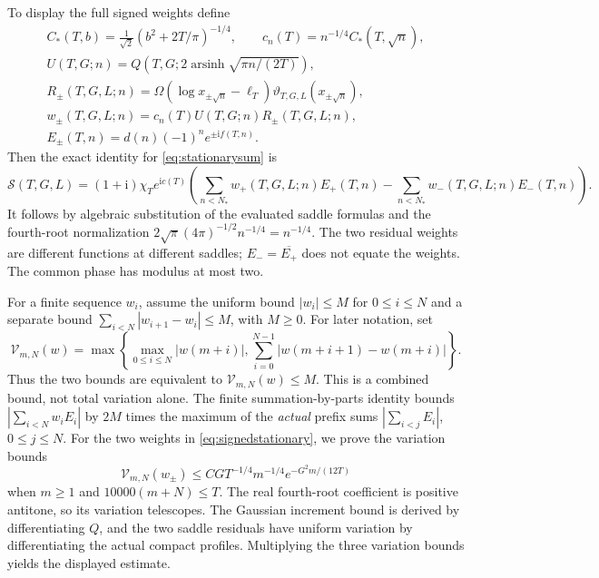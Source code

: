 \documentclass[11pt,a4paper]{article}
\numberwithin{equation}{section}
\theoremstyle{definition}
\newcommand{\ii}{\mathrm i}
\newcommand{\arsinh}{\operatorname{arsinh}}
\begin{document}
To display the full signed weights define
\begin{gather*}
 C_*(T,b)=\frac1{\sqrt2}(b^2+2T/\pi)^{-1/4},\qquad
 c_n(T)=n^{-1/4}C_*(T,\sqrt n),\\
 U(T,G;n)=Q\!\left(T,G;2\arsinh\sqrt{\pi n/(2T)}\right),\\
 R_\pm(T,G,L;n)=\Omega(\log x_{\pm\sqrt n}-\ell_T)
                         \vartheta_{T,G,L}(x_{\pm\sqrt n}),\\
 w_\pm(T,G,L;n)=c_n(T)U(T,G;n)R_\pm(T,G,L;n),\\
 E_\pm(T,n)=d(n)(-1)^n e^{\pm\ii f(T,n)}.
\end{gather*}
Then the exact identity for \eqref{eq:stationarysum} is
\begin{equation}\label{eq:signedstationary}
 \mathcal S(T,G,L)=(1+\ii)\chi_Te^{\ii c(T)}
       \left(\sum_{n<N_*}w_+(T,G,L;n)E_+(T,n)
                    -\sum_{n<N_*}w_-(T,G,L;n)E_-(T,n)\right).
\end{equation}
It follows by algebraic substitution of the evaluated saddle formulas and the
fourth-root normalization
$2\sqrt\pi(4\pi)^{-1/2}n^{-1/4}=n^{-1/4}$.
The two residual weights are different functions at different saddles;
$E_- =\overline{E_+}$ does not equate the weights. The common phase has modulus
at most two.

For a finite sequence $w_i$, assume the uniform bound $|w_i|\le M$ for
$0\le i\le N$ and a separate bound
$\sum_{i<N}|w_{i+1}-w_i|\le M$, with $M\ge0$.
For later notation, set
\[
 \mathcal V_{m,N}(w)=\max\left\{
    \max_{0\le i\le N}|w(m+i)|,
    \sum_{i=0}^{N-1}|w(m+i+1)-w(m+i)|\right\}.
\]
Thus the two bounds are equivalent to $\mathcal V_{m,N}(w)\le M$.
This is a combined bound, not total variation alone.
The finite summation-by-parts identity bounds
$|\sum_{i<N}w_iE_i|$ by $2M$ times the maximum of the \emph{actual}
prefix sums $|\sum_{i<j}E_i|$, $0\le j\le N$.
For the two weights in \eqref{eq:signedstationary}, we prove the
variation bounds
\[
 \mathcal V_{m,N}(w_\pm)
 \le C G T^{-1/4}m^{-1/4}e^{-G^2m/(12T)}
\]
when $m\ge1$ and $10000(m+N)\le T$. The real fourth-root coefficient is
positive antitone, so its variation telescopes. The Gaussian increment bound
is derived by differentiating $Q$, and the two saddle residuals have uniform
variation by differentiating the actual compact profiles. Multiplying the
three variation bounds yields the displayed estimate.
\end{document}
